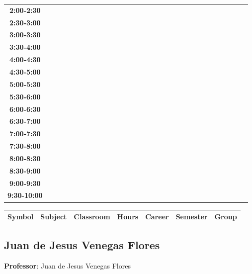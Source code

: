 \documentclass{article}
\begin{document}
\begin{table}[ht]
\begin{tabular}{|c|c|c|c|c|c|c|c|c|c|c|c|c|c|c|c|c|c|c|c|c|c|c|c|c|c|c|c|c|c|}
\cline{1-8} 
\textbf{2:00-2:30} &   &   &   &   &   &   &   \\
\cline{1-8} 
\textbf{2:30-3:00} &   &   &   &   &   &   &   \\
\cline{1-8} 
\textbf{3:00-3:30} &   &   &   &   &   &   &   \\
\cline{1-8} 
\textbf{3:30-4:00} &   &   &   &   &   &   &   \\
\cline{1-8} 
\textbf{4:00-4:30} &   &   &   &   &   &   &   \\
\cline{1-8} 
\textbf{4:30-5:00} &   &   &   &   &   &   &   \\
\cline{1-8} 
\textbf{5:00-5:30} &   &   &   &   &   &   &   \\
\cline{1-8} 
\textbf{5:30-6:00} &   &   &   &   &   &   &   \\
\cline{1-8} 
\textbf{6:00-6:30} &   &   &   &   &   &   &   \\
\cline{1-8} 
\textbf{6:30-7:00} &   &   &   &   &   &   &   \\
\cline{1-8} 
\textbf{7:00-7:30} &   &   &   &   &   &   &   \\
\cline{1-8} 
\textbf{7:30-8:00} &   &   &   &   &   &   &   \\
\cline{1-8} 
\textbf{8:00-8:30} &   &   &   &   &   &   &   \\
\cline{1-8} 
\textbf{8:30-9:00} &   &   &   &   &   &   &   \\
\cline{1-8} 
\textbf{9:00-9:30} &   &   &   &   &   &   &   \\
\cline{1-8} 
\textbf{9:30-10:00} &   &   &   &   &   &   &   \\
\cline{1-8} 
\end{tabular}\end{table}


\begin{longtable}{|c|p{4cm}|c|c|c|c|c|}
\hline
\textbf{Symbol} & \textbf{Subject} & \textbf{Classroom} & \textbf{Hours} & \textbf{Career} & \textbf{Semester} & \textbf{Group} \\
\hline
\end{longtable}

\newpage


\subsection{Juan de Jesus Venegas Flores}
\vspace*{.1cm}

\begin{flushright}
{\LARGE \textbf{Professor}: Juan de Jesus Venegas Flores}
\end{flushright}
\vspace{1cm}
\end{document}

